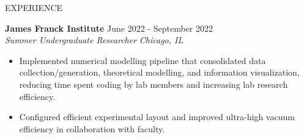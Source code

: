 \documentclass{resume} %
\begin{document}
\begin{rSection}{EXPERIENCE}
\begin{itemize}
\begin{itemize}
\begin{itemize}
      \end{itemize}
   
    
\end{itemize}

 \end{itemize}
 
\textbf{James Franck Institute} \hfill June 2022  - September 2022 \\
\textit{Summer Undergraduate Researcher} \hfill \textit{Chicago, IL}
\vspace{-0.6em}
 \begin{itemize}
   \itemsep -5.8pt {}
   \item Implemented numerical modelling pipeline that consolidated data collection/generation, theoretical modelling, and information visualization, reducing time spent coding by lab members and increasing lab research efficiency.
   \item Configured efficient experimental layout and improved ultra-high vacuum efficiency in collaboration with faculty.
    
 \end{itemize}

\end{rSection} 
\end{document}
